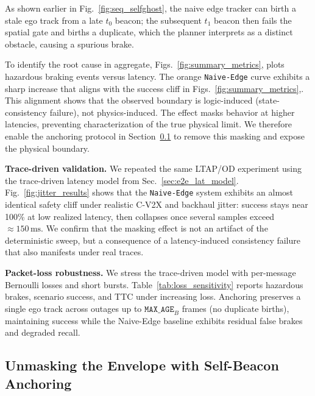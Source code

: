 As shown earlier in Fig.~\ref{fig:seq_selfghost}, the naive edge tracker can birth a stale ego track from a late $t_0$ beacon; the subsequent $t_1$ beacon then fails the spatial gate and births a duplicate, which the planner interprets as a distinct obstacle, causing a spurious brake.

To identify the root cause in aggregate, Figs.~\ref{fig:summary_metrics}, plots hazardous braking events versus latency. The orange \texttt{Naive-Edge} curve exhibits a sharp increase that aligns with the success cliff in Figs.~\ref{fig:summary_metrics},. This alignment shows that the observed boundary is logic-induced (state-consistency failure), not physics-induced. The effect masks behavior at higher latencies, preventing characterization of the true physical limit. We therefore enable the anchoring protocol in Section~\ref{sec:unmasking} to remove this masking and expose the physical boundary.



\noindent\textbf{Trace-driven validation.}
We repeated the same LTAP/OD experiment using the trace-driven latency model from Sec.~\ref{sec:e2e_lat_model}.
Fig.~\ref{fig:jitter_results} shows that the \texttt{Naive-Edge} system exhibits an almost identical safety cliff under realistic C-V2X and backhaul jitter: success stays near 100\% at low realized latency, then collapses once several samples exceed \(\approx 150\,\mathrm{ms}\). We confirm that the masking effect is not an artifact of the deterministic sweep, but a consequence of a latency-induced consistency failure that also manifests under real traces.

\noindent\textbf{Packet-loss robustness.}
We stress the trace-driven model with per-message Bernoulli losses and short bursts. Table~\ref{tab:loss_sensitivity} reports hazardous brakes, scenario success, and TTC under increasing loss. Anchoring preserves a single ego track across outages up to $\texttt{MAX\_AGE}_B$ frames (no duplicate births), maintaining success while the Naive-Edge baseline exhibits residual false brakes and degraded recall.



\subsection{Unmasking the Envelope with Self-Beacon Anchoring}
\label{sec:unmasking}

